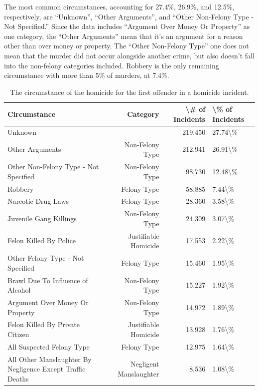 \documentclass[
  12pt,
  openany]{book}
\begin{document}
The most common circumstances, accounting for 27.4\%, 26.9\%, and 12.5\%, respectively, are ``Unknown'', ``Other Arguments'', and ``Other Non-Felony Type - Not Specified.'' Since the data includes ``Argument Over Money Or Property'' as one category, the ``Other Arguments'' mean that it's an argument for a reason other than over money or property. The ``Other Non-Felony Type'' one does not mean that the murder did not occur alongside another crime, but also doesn't fall into the non-felony categories included. Robbery is the only remaining circumstance with more than 5\% of murders, at 7.4\%.

\begin{longtable}[t]{lrrl}
\caption{\label{tab:shrCircumstance}The circumstance of the homicide for the first offender in a homicide incident.}\\
\toprule
Circumstance & Category & \textbackslash{}\# of Incidents & \textbackslash{}\% of Incidents\\
\midrule
Unknown &  & 219,450 & 27.74\textbackslash{}\%\\
Other Arguments & Non-Felony Type & 212,941 & 26.91\textbackslash{}\%\\
Other Non-Felony Type - Not Specified & Non-Felony Type & 98,730 & 12.48\textbackslash{}\%\\
Robbery & Felony Type & 58,885 & 7.44\textbackslash{}\%\\
Narcotic Drug Laws & Felony Type & 28,360 & 3.58\textbackslash{}\%\\
\addlinespace
Juvenile Gang Killings & Non-Felony Type & 24,309 & 3.07\textbackslash{}\%\\
Felon Killed By Police & Justifiable Homicide & 17,553 & 2.22\textbackslash{}\%\\
Other Felony Type - Not Specified & Felony Type & 15,460 & 1.95\textbackslash{}\%\\
Brawl Due To Influence of Alcohol & Non-Felony Type & 15,227 & 1.92\textbackslash{}\%\\
Argument Over Money Or Property & Non-Felony Type & 14,972 & 1.89\textbackslash{}\%\\
\addlinespace
Felon Killed By Private Citizen & Justifiable Homicide & 13,928 & 1.76\textbackslash{}\%\\
All Suspected Felony Type & Felony Type & 12,975 & 1.64\textbackslash{}\%\\
All Other Manslaughter By Negligence Except Traffic Deaths & Negligent Manslaughter & 8,536 & 1.08\textbackslash{}\%\\

\end{longtable}
\end{document}
